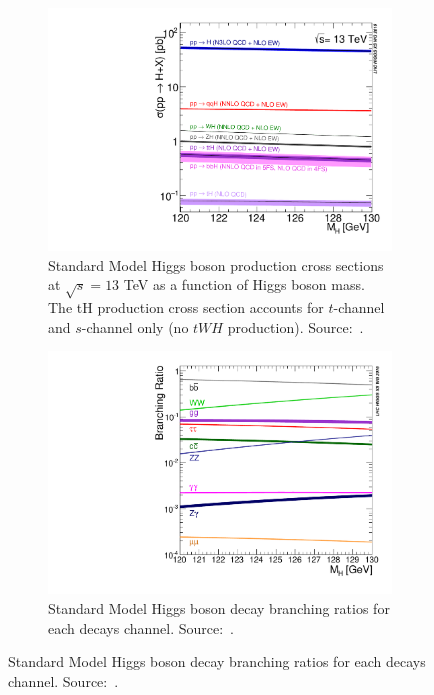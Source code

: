 \begin{figure}[htbp]
  \centering
  \begin{subfigure}[htbp]{0.48\textwidth}
    \centering
    \includegraphics[width=\textwidth]{figures_and_tables/theory/higgs_prod_modes.pdf}
    \caption{  Standard Model Higgs boson production cross sections at $\sqrt{s}=13$ TeV as a function of Higgs boson mass. The tH production cross section accounts for $t$-channel and $s$-channel only (no $tWH$ production). Source:~\cite{deFlorian:2016spz}.}
  \label{higgs_prod_modes}
  \end{subfigure}
  \hfill
  \begin{subfigure}[htbp]{0.48\textwidth}
    \centering
    \includegraphics[width=\textwidth]{figures_and_tables/theory/higgs_decays.pdf}
    \caption{ Standard Model Higgs boson decay branching ratios for each decays channel. Source:~\cite{deFlorian:2016spz}.}
    \label{higgs_decays}
  \end{subfigure}
\end{figure}

